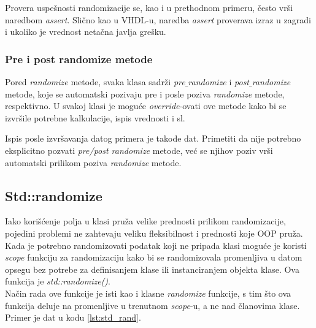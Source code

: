 Provera uspešnosti randomizacije se, kao i u prethodnom primeru, često vrši
naredbom \emph{assert}. Slično kao u VHDL-u, naredba \emph{assert} proverava
izraz u zagradi i ukoliko je vrednost netačna javlja grešku.

\subsubsection{Pre i post randomize metode}

Pored \emph{randomize} metode, svaka klasa sadrži \emph{pre\(\_\)randomize} i
\emph{post\(\_\)randomize} metode, koje se automatski pozivaju pre i posle
poziva \emph{randomize} metode, respektivno. U svakoj klasi je moguće
\emph{override}-ovati ove metode kako bi se izvršile potrebne kalkulacije, ispis
vrednosti i sl.



Ispis posle izvršavanja datog primera je takođe dat. Primetiti da nije potrebno
eksplicitno pozvati \emph{pre/post randomize} metode, već se njihov poziv vrši
automatski prilikom poziva \emph{randomize} metode.


\subsection{Std::randomize}

Iako korišćenje polja u klasi pruža velike prednosti prilikom randomizacije,
pojedini problemi ne zahtevaju veliku fleksibilnost i prednosti koje OOP pruža.
Kada je potrebno randomizovati podatak koji ne pripada klasi moguće je koristi
\emph{scope} funkciju za randomizaciju kako bi se randomizovala promenljiva u
datom opsegu bez potrebe za definisanjem klase ili instanciranjem objekta klase.
Ova funkcija je \emph{std::randomize()}.\\

Način rada ove funkcije je isti kao i klasne \emph{randomize} funkcije, s tim
što ova funkcija deluje na promenljive u trenutnom \emph{scope}-u, a ne nad
članovima klase. Primer je dat u kodu \ref{lst:std_rand}.




